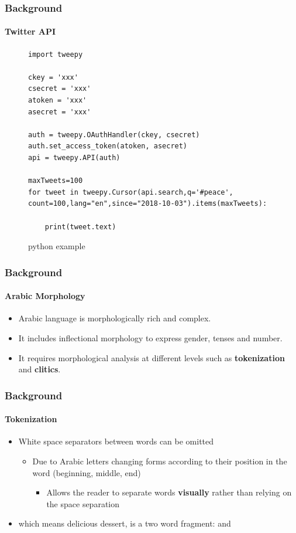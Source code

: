 \documentclass[xcolor=table]{beamer}
\newcommand{\bi}{\begin{itemize}}
\newcommand{\ei}{\end{itemize}}
\newcommand{\I}{\item}
\begin{document}
\begin{frame}[fragile]
\frametitle{Background}
\framesubtitle{Twitter API}
\begin{figure}
    \lstset{language=Python}
\lstset{frame=lines}
\lstset{basicstyle=\footnotesize}
\begin{lstlisting}
import tweepy

ckey = 'xxx'
csecret = 'xxx'
atoken = 'xxx'
asecret = 'xxx'

auth = tweepy.OAuthHandler(ckey, csecret)
auth.set_access_token(atoken, asecret)
api = tweepy.API(auth)

maxTweets=100
for tweet in tweepy.Cursor(api.search,q='#peace',
count=100,lang="en",since="2018-10-03").items(maxTweets):
	
	print(tweet.text)
\end{lstlisting}
\caption{python example}
\end{figure}


\end{frame}

\begin{frame}
\frametitle{Background}
\framesubtitle{Arabic Morphology}
\begin{itemize}
\item Arabic language is morphologically rich and complex.
\item It includes inflectional morphology to express gender, tenses and number.
\item It requires morphological analysis at different levels such as \textbf{tokenization} and \textbf{clitics}.
\end{itemize}

\end{frame}


\begin{frame}
\frametitle{Background}
\framesubtitle{Tokenization}

\begin{itemize}
\item White space separators between words can be omitted
\bi
\I Due to Arabic letters changing forms according to their position in the word (beginning, middle, end)
\bi
\I Allows the reader to separate words \textbf{visually} rather than relying on the space separation
\ei
\ei



\item {} which means delicious dessert, is a two word fragment: 
and 
\end{itemize}
\end{frame}
\end{document}
